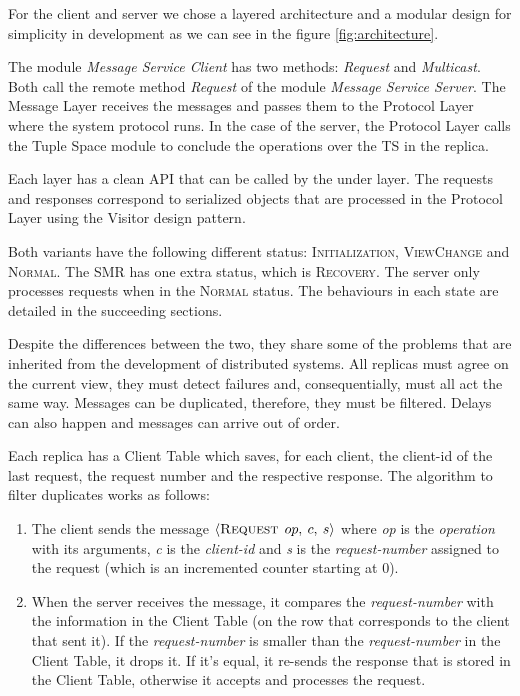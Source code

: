 \documentclass[times, 10pt,twocolumn]{article}
\begin{document}
For the client and server we chose a layered architecture and a modular design for simplicity
in development as we can see in the figure \ref{fig:architecture}. 

The module \textit{Message Service Client} has two methods: \textit{Request} and \textit{Multicast}. Both call 
the remote method \textit{Request} of the module \textit{Message Service Server}. The Message Layer receives the messages and passes them to the Protocol Layer where the system protocol runs. 
In the case of the server, the Protocol Layer calls the Tuple Space module to conclude
the operations over the TS in the replica.

Each layer has a clean API that can be called by the under layer. The requests and
responses correspond to serialized objects that are processed in the Protocol Layer
using the Visitor design pattern.

 \label{overview}
Both variants have the following different status: \textsc{Initialization}, \textsc{ViewChange} and
\textsc{Normal}. The SMR has one extra status, which is \textsc{Recovery}. The server only 
processes requests when in the \textsc{Normal} status. The behaviours in each state are detailed in the succeeding sections.

Despite the differences between the two, they share some of the problems that
are inherited from the development of distributed systems. All replicas must agree on the 
current view, they must detect failures and, consequentially, must all act the same
way. Messages can be duplicated, therefore, they must be filtered. Delays can also happen and messages can arrive out of order.

 \label{filter_duplicates}
Each replica has a Client Table which saves, for each client, the client-id of the last request, the request number
and the respective response. The algorithm to filter duplicates works as follows:
\begin{enumerate}
  \item The client sends the message 
  $\left \langle   \textsc{Request} \: \: op, \: c, \: s \right \rangle$ where
 \textit{op} is the \textit{operation} with its arguments, \textit{c} is the \textit{client-id} and \textit{s} is the \textit{request-number} assigned to the request (which is an incremented counter
 starting at 0).
  \item When the server receives the message, it compares the \textit{request-number} with
  the information in the Client Table (on the row that corresponds to the client that sent it). If the \textit{request-number} is smaller than the
  \textit{request-number} in the Client Table, it drops it. If it's equal, it re-sends 
  the response that is stored in the Client Table, otherwise it accepts and processes the request.
\end{enumerate}
\end{document}
